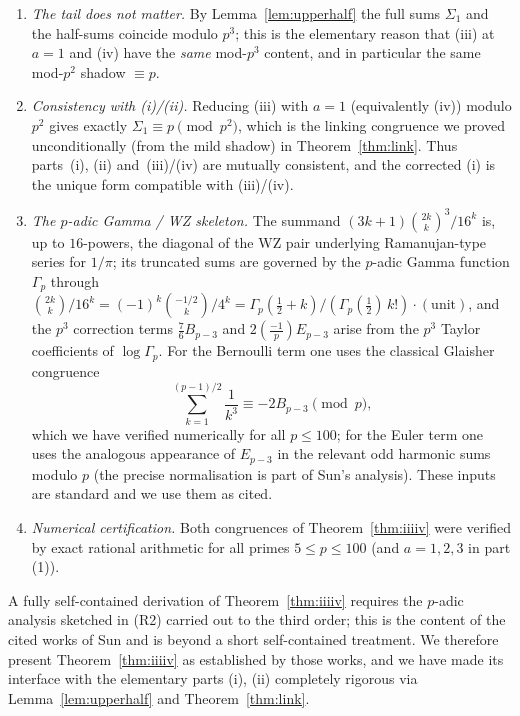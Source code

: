 \documentclass[12pt]{article}
\theoremstyle{remark}
\newcommand{\leg}[2]{\left(\frac{#1}{#2}\right)}
\newcommand{\bin}[2]{\binom{#1}{#2}}
\begin{document}
\begin{enumerate}
\item[(R0)] \emph{The tail does not matter.}  By Lemma~\ref{lem:upperhalf} the
full sums $\Sigma_1$ and the half-sums coincide modulo $p^3$; this is the
elementary reason that (iii) at $a=1$ and (iv) have the \emph{same} mod-$p^3$
content, and in particular the same mod-$p^2$ shadow $\equiv p$.
\item[(R1)] \emph{Consistency with (i)/(ii).}  Reducing (iii) with $a=1$
(equivalently (iv)) modulo $p^2$ gives exactly $\Sigma_1\equiv p\pmod{p^2}$,
which is the linking congruence we proved unconditionally (from the mild
shadow) in Theorem~\ref{thm:link}.  Thus parts~(i), (ii) and~(iii)/(iv) are
mutually consistent, and the corrected (i) is the unique form compatible with
(iii)/(iv).
\item[(R2)] \emph{The $p$-adic Gamma / WZ skeleton.}  The summand
$(3k+1)\bin{2k}{k}^3/16^k$ is, up to $16$-powers, the diagonal of the WZ pair
underlying Ramanujan-type series for $1/\pi$; its truncated sums are governed by
the $p$-adic Gamma function $\Gamma_p$ through
$\bin{2k}{k}/16^k=(-1)^k\bin{-1/2}{k}/4^k=\Gamma_p(\tfrac12+k)/(\Gamma_p(\tfrac12)\,k!)\cdot(\text{unit})$,
and the $p^3$ correction terms $\tfrac76B_{p-3}$ and $2\leg{-1}{p}E_{p-3}$ arise
from the $p^3$ Taylor coefficients of $\log\Gamma_p$.  For the Bernoulli term
one uses the classical Glaisher congruence
\[
\sum_{k=1}^{(p-1)/2}\frac1{k^3}\equiv-2B_{p-3}\pmod p ,
\]
which we have verified numerically for all $p\le100$; for the Euler term one
uses the analogous appearance of $E_{p-3}$ in the relevant odd harmonic sums
modulo $p$ (the precise normalisation is part of Sun's analysis).  These
inputs are standard and we use them as cited.
\item[(R3)] \emph{Numerical certification.}  Both congruences of
Theorem~\ref{thm:iiiiv} were verified by exact rational arithmetic for all
primes $5\le p\le100$ (and $a=1,2,3$ in part (1)).
\end{enumerate}

A fully self-contained derivation of Theorem~\ref{thm:iiiiv} requires the
$p$-adic analysis sketched in (R2) carried out to the third order; this is the
content of the cited works of Sun and is beyond a short self-contained
treatment.  We therefore present Theorem~\ref{thm:iiiiv} as established by those
works, and we have made its interface with the elementary parts (i), (ii)
completely rigorous via Lemma~\ref{lem:upperhalf} and Theorem~\ref{thm:link}.
\end{document}
